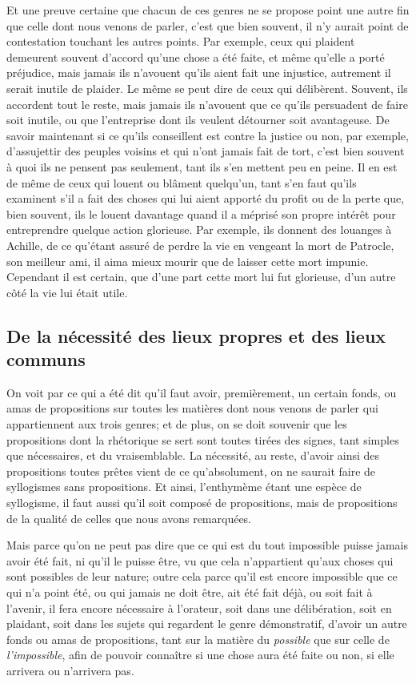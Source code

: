 Et une preuve certaine que chacun de ces genres ne se propose point une autre fin que celle dont nous venons de parler,
c'est que bien souvent, il n'y aurait point de contestation touchant les autres points. Par exemple, ceux qui plaident
demeurent souvent d'accord qu'une chose a été faite, et même qu'elle a porté préjudice, mais jamais ils n'avouent qu'ils
aient fait une injustice, autrement il serait inutile de plaider. Le même se peut dire de ceux qui délibèrent. Souvent,
ils accordent tout le reste, mais jamais ils n'avouent que ce qu'ils persuadent de faire soit inutile, ou que l'entreprise
dont ils veulent détourner soit avantageuse. De savoir maintenant si ce qu'ils conseillent est contre la justice ou non,
par exemple, d'assujettir des peuples voisins et qui n'ont jamais fait de tort, c'est bien souvent à quoi ils ne pensent
pas seulement, tant ils s'en mettent peu en peine. Il en est de même de ceux qui louent ou blâment quelqu'un, tant s'en
faut qu'ils examinent s'il a fait des choses qui lui aient apporté du profit ou de la perte que, bien souvent, ils le
louent davantage quand il a méprisé son propre intérêt pour entreprendre quelque action glorieuse. Par exemple, ils
donnent des louanges à Achille, de ce qu'étant assuré de perdre la vie en vengeant la mort de Patrocle, son meilleur ami,
il aima mieux mourir que de laisser cette mort impunie. Cependant il est certain, que d'une part cette mort lui fut
glorieuse, d'un autre côté la vie lui était utile.

\subsection{De la nécessité des lieux propres et des lieux communs}

On voit par ce qui a été dit qu'il faut avoir, premièrement, un certain fonds, ou amas de propositions sur toutes les matières
dont nous venons de parler qui appartiennent aux trois genres; et de plus, on se doit souvenir que les propositions dont la
rhétorique se sert sont toutes tirées des signes, tant simples que nécessaires, et du vraisemblable. La nécessité, au reste,
d'avoir ainsi des propositions toutes prêtes vient de ce qu'absolument, on ne saurait faire de syllogismes sans propositions.
Et ainsi, l'enthymème étant une espèce de syllogisme, il faut aussi qu'il soit composé de propositions, mais de propositions
de la qualité de celles que nous avons remarquées.

\bigbreak

Mais parce qu'on ne peut pas dire que ce qui est du tout impossible puisse jamais avoir été fait, ni qu'il le puisse être, vu
que cela n'appartient qu'aux choses qui sont possibles de leur nature; outre cela parce qu'il est encore impossible que ce qui
n'a point été, ou qui jamais ne doit être, ait été fait déjà, ou soit fait à l'avenir, il fera encore nécessaire à l'orateur,
soit dans une délibération, soit en plaidant, soit dans les sujets qui regardent le genre démonstratif, d'avoir un autre fonds
ou amas de propositions, tant sur la matière du \emph{possible} que sur celle de \emph{l'impossible}, afin de pouvoir connaître
si une chose aura été faite ou non, si elle arrivera ou n'arrivera pas.

